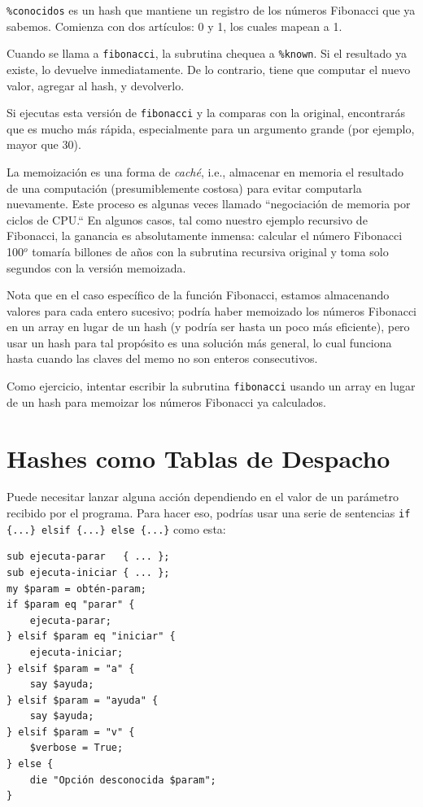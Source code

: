 \verb|%conocidos| es un hash que mantiene un registro
de los números Fibonacci que ya sabemos. Comienza con dos
artículos: 0 y 1, los cuales mapean a 1.

Cuando se llama a {\tt fibonacci}, la subrutina chequea a
\verb|%known|. Si el resultado ya existe, lo devuelve inmediatamente.
De lo contrario, tiene que computar el nuevo valor, 
agregar al hash, y devolverlo.

Si ejecutas esta versión de {\tt fibonacci} y la comparas con
la original, encontrarás que es mucho más rápida, especialmente
para un argumento grande (por ejemplo, mayor que 30).

La memoización es una forma de \emph{caché}, i.e., almacenar en 
memoria el resultado de una computación (presumiblemente costosa)
para evitar computarla nuevamente. Este proceso es algunas veces 
llamado ``negociación de memoria por ciclos de CPU.`` En algunos 
casos, tal como nuestro ejemplo recursivo de Fibonacci, la ganancia
es absolutamente inmensa: calcular el número Fibonacci 100$^{o}$
tomaría billones de años con la subrutina recursiva original
y toma solo segundos con la versión memoizada. 

Nota que en el caso específico de la función Fibonacci,
estamos almacenando valores para cada entero sucesivo; podría
haber memoizado los números Fibonacci en un array en lugar de 
un hash (y podría ser hasta un poco más eficiente), pero usar
un hash para tal propósito es una solución más general, 
lo cual funciona hasta cuando las claves del memo no son
enteros consecutivos.

Como ejercicio, intentar escribir la subrutina {\tt fibonacci}
usando un array en lugar de un hash para memoizar los números
Fibonacci ya calculados.


\section{Hashes como Tablas de Despacho}
\label{dispatch}

Puede necesitar lanzar alguna acción dependiendo en el valor
de un parámetro recibido por el programa. Para hacer eso,
podrías usar una serie de sentencias
\verb'if {...} elsif {...} else {...}' como esta:

\begin{verbatim}
sub ejecuta-parar   { ... };
sub ejecuta-iniciar { ... };
my $param = obtén-param;
if $param eq "parar" {
    ejecuta-parar;
} elsif $param eq "iniciar" {
    ejecuta-iniciar;
} elsif $param = "a" {
    say $ayuda;
} elsif $param = "ayuda" {
    say $ayuda;
} elsif $param = "v" {
    $verbose = True;
} else {
    die "Opción desconocida $param";
}
\end{verbatim}

